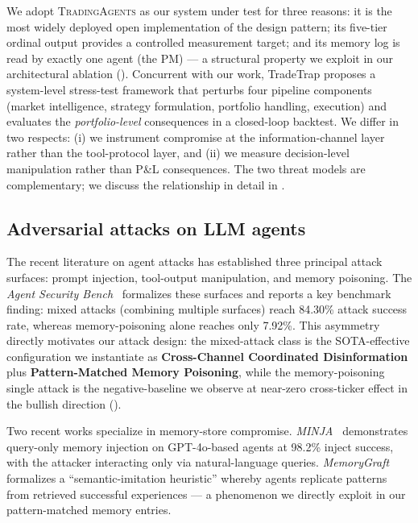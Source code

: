 \documentclass[10pt,letterpaper]{article}
\newcommand{\attack}[1]{\textbf{#1}}
\newcommand{\TA}{\textsc{TradingAgents}}
\begin{document}
We adopt \TA{} as our system under test for three reasons: it is the
most widely deployed open implementation of the design pattern; its
five-tier ordinal output provides a controlled measurement target;
and its memory log is read by exactly one agent (the PM) --- a
structural property we exploit in our architectural ablation
(). Concurrent with our work, TradeTrap
\citep{tradetrap2025} proposes a system-level stress-test framework
that perturbs four pipeline components (market intelligence, strategy
formulation, portfolio handling, execution) and evaluates the
\emph{portfolio-level} consequences in a closed-loop backtest. We
differ in two respects: (i) we instrument compromise at the
information-channel layer rather than the tool-protocol layer, and
(ii) we measure decision-level manipulation rather than P\&L
consequences. The two threat models are complementary; we discuss the
relationship in detail in .

\subsection{Adversarial attacks on LLM agents}\label{sec:related-attacks}

The recent literature on agent attacks has established three principal
attack surfaces: prompt injection, tool-output manipulation, and
memory poisoning. The \emph{Agent Security Bench}~\citep{zhang2025asb}
formalizes these surfaces and reports a key benchmark finding: mixed
attacks (combining multiple surfaces) reach 84.30\% attack success
rate, whereas memory-poisoning alone reaches only 7.92\%. This
asymmetry directly motivates our attack design: the mixed-attack class is
the SOTA-effective configuration we instantiate as
\attack{Cross-Channel Coordinated Disinformation} plus
\attack{Pattern-Matched Memory Poisoning}, while the memory-poisoning
single attack is the negative-baseline we observe at near-zero
cross-ticker effect in the bullish direction
().

Two recent works specialize in memory-store compromise.
\emph{MINJA}~\citep{dong2025minja} demonstrates query-only memory
injection on GPT-4o-based agents at 98.2\% inject success, with the
attacker interacting only via natural-language queries.
\emph{MemoryGraft}~\citep{srivastava2025memorygraft} formalizes a
``semantic-imitation heuristic'' whereby agents replicate patterns
from retrieved successful experiences --- a phenomenon we directly
exploit in our pattern-matched memory entries.
\end{document}
